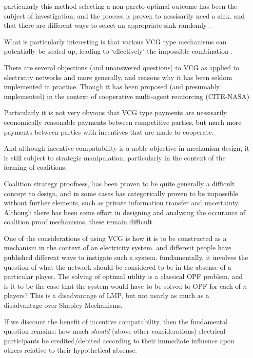 particularly this method selecting a non-pareto optimal outcome has been the subject of investigation, and the process is proven to nessisarily need a sink.
and that there are different ways to select an appropriate sink randomly \cite{NATH2019673}.

What is particularly interesting is that various VCG type mechanisms can potentially be scaled up, leading to `effectively' the impossible combination \cite{NATH2019673}.

There are several objections (and unanswered questions) to VCG as applied to electricity networks and more generally, and reasons why it has been seldom implemented in practice.\cite{journals/ior/Rothkopf07}\cite{Ausubel2006}
Though it has been proposed (and presumably implemented) in the context of cooperative multi-agent reinforcing (CITE-NASA)

Particularly it is not very obvious that VCG type payments are nessisarily economically reasonable payments between competitive parties, but much more payments between parties with incentives that are made to cooperate.

And although incentive compatability is a noble objective in mechanism design, it is still subject to strategic manipulation, particularly in the context of the forming of coalitions.

Coalition strategy proofness, has been proven to be quite generally a difficult concept to design, and in some cases has categorically proven to be impossible \cite{10.2307/2297048} without further elements, such as private information transfer and uncertainty.
Although there has been some effort in designing and analysing the occurance of coalition proof mechanisms, these remain difficult.

One of the considerations of using VCG is how it is to be constructed as a mechanism in the context of an electricity system.
and different people have published different ways to instigate such a system.
fundamentally, it involves the question of what the network should be considered to be in the absense of a particular player.
The solving of optimal utility is a classical OPF problem, and is it to be the case that the system would have to be solved to OPF for each of $n$ players?
This is a disadvantage of LMP, but not nearly as much as a disadvantage over Shapley Mechanisms.

If we discount the benefit of incentive compatability, then the fundamental question remains: how much \textit{should} (above other considerations) electrical participants be credited/debited according to their immediate influence apon others relative to their hypothetical absense.

